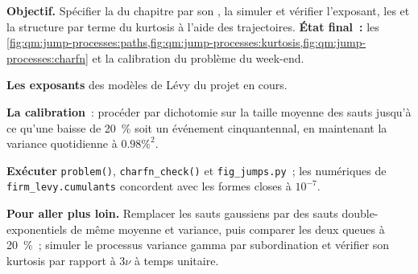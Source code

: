 \begin{tutorial}
\textbf{Objectif.} Spécifier la  du chapitre par son , la simuler et
vérifier l'exposant, les  et la structure par terme du kurtosis à l'aide des trajectoires.
\textbf{État final~:} les \cref{fig:qm:jump-processes:paths,fig:qm:jump-processes:kurtosis,fig:qm:jump-processes:charfn}
et la calibration du problème du week-end.
\begin{tutsteps}
\item \textbf{Les exposants} des modèles de Lévy du projet en cours.
\label{lst:qm:jump-processes:psi}
\item \textbf{La calibration}~: procéder par dichotomie sur la taille moyenne des sauts jusqu'à ce qu'une baisse de 20~\% soit un
événement cinquantennal, en maintenant la variance quotidienne à $0.98\%^2$.
\label{lst:qm:jump-processes:calibrate}
\item \textbf{Exécuter} \texttt{problem()}, \texttt{charfn\_check()} et \texttt{fig\_jumps.py}~; les  numériques de
\texttt{firm\_levy.cumulants} concordent avec les formes closes à $10^{-7}$.
\end{tutsteps}
\textbf{Pour aller plus loin.} Remplacer les sauts gaussiens par des sauts double-exponentiels de même moyenne et
variance, puis comparer les deux queues à 20~\%~; simuler le processus variance gamma par subordination et vérifier son
kurtosis par rapport à $3\nu$ à temps unitaire.
\end{tutorial}

